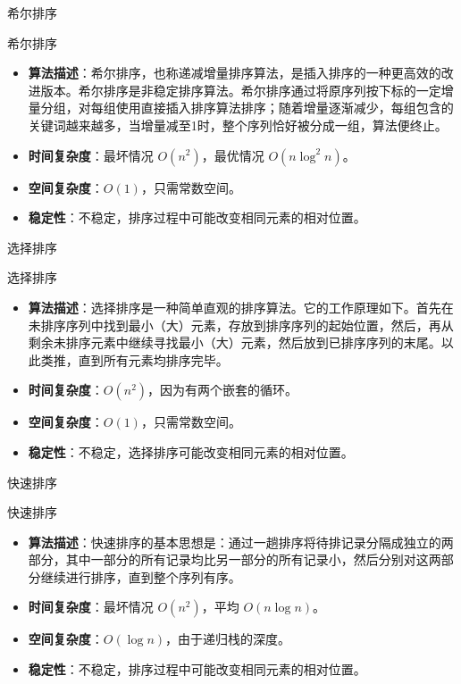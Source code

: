 \documentclass{beamer}
\begin{document}
\begin{frame}{希尔排序}
    \begin{block}{希尔排序}
        \begin{itemize}
            \item \textbf{算法描述}：希尔排序，也称递减增量排序算法，是插入排序的一种更高效的改进版本。希尔排序是非稳定排序算法。希尔排序通过将原序列按下标的一定增量分组，对每组使用直接插入排序算法排序；随着增量逐渐减少，每组包含的关键词越来越多，当增量减至1时，整个序列恰好被分成一组，算法便终止。
            \item \textbf{时间复杂度}：最坏情况 $O(n^2)$，最优情况 $O(n \log^2 n)$。
            \item \textbf{空间复杂度}：$O(1)$，只需常数空间。
            \item \textbf{稳定性}：不稳定，排序过程中可能改变相同元素的相对位置。
        \end{itemize}
    \end{block}
\end{frame}

\begin{frame}{选择排序}
    \begin{block}{选择排序}
        \begin{itemize}
            \item \textbf{算法描述}：选择排序是一种简单直观的排序算法。它的工作原理如下。首先在未排序序列中找到最小（大）元素，存放到排序序列的起始位置，然后，再从剩余未排序元素中继续寻找最小（大）元素，然后放到已排序序列的末尾。以此类推，直到所有元素均排序完毕。
            \item \textbf{时间复杂度}：$O(n^2)$，因为有两个嵌套的循环。
            \item \textbf{空间复杂度}：$O(1)$，只需常数空间。
            \item \textbf{稳定性}：不稳定，选择排序可能改变相同元素的相对位置。
        \end{itemize}
    \end{block}
\end{frame}

\begin{frame}{快速排序}
    \begin{block}{快速排序}
        \begin{itemize}
            \item \textbf{算法描述}：快速排序的基本思想是：通过一趟排序将待排记录分隔成独立的两部分，其中一部分的所有记录均比另一部分的所有记录小，然后分别对这两部分继续进行排序，直到整个序列有序。
            \item \textbf{时间复杂度}：最坏情况 $O(n^2)$，平均 $O(n \log n)$。
            \item \textbf{空间复杂度}：$O(\log n)$，由于递归栈的深度。
            \item \textbf{稳定性}：不稳定，排序过程中可能改变相同元素的相对位置。
        \end{itemize}
    \end{block}
\end{frame}
\end{document}
